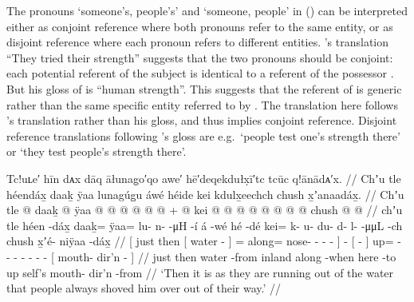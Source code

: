 The pronouns  ‘someone’s, people’s’ and  ‘someone, people’ in (\lastx) can be interpreted either as conjoint reference where both pronouns refer to the same entity, or as disjoint reference where each pronoun refers to different entities.
\citeauthor{swanton:1909}’s translation “They tried their strength” suggests that the two pronouns should be conjoint: each potential referent of the subject  is identical to a referent of the possessor .
But his gloss of   is “human strength”.
This suggests that the referent of  is generic rather than the same specific entity referred to by .
The translation here follows \citeauthor{swanton:1909}’s translation rather than his gloss, and thus implies conjoint reference.
Disjoint reference translations following \citeauthor{swanton:1909}’s gloss are e.g.\ ‘people test one’s strength there’ or ‘they test people’s strength there’.

\ex\label{ex:93-17-out-of-water-push}%
%
\begingl
	\glpreamble	Tc!uʟe′ hīn dᴀx dāq āłunag̣o′qo awe′ hē′deqekdułx̣ī′tc tcūc q!ānādᴀ′x. //
	\glpreamble	Chʼu tle héendáx̱ daaḵ ÿaa lunagúg̱u áwé héide kei kdulx̱eechch chush x̱ʼanaadáx̱. //
	\gla	{} Chʼu tle {}  @ {} {}
			daaḵ @ ÿaa @  @ {} @ {} @ {} @ {} {} 
		 @ {} +
		{}  @ {} {}
		kei @  @ {} @ {} @ {} @ {} @ {} @ {} @ {}
		{} chush  @ {} @ {} {} //
	\glb	{} chʼu tle {} héen -dáx̱ {}
			daaḵ= ÿaa= lu- n-  -μH -í {}
		á -wé
		{} hé -dé {}
		kei= k- u- du- d- l-  -μμL -ch
		{} chush x̱ʼé- niÿaa -dáx̱ {} //
	\glc	{}[ just then {}[ water - {}]
			= along= nose- -  - - {}]
		 -
		{}[  - {}]
		up= - - - - -  - -
		{}[  mouth- dir’n - {}] //
	\gld	{} just then {} water -from {}
			inland along  {} {} {} -when {}
		 {}
		{} here -to {}
		up  {} {} {} {} {} {} {}
		{} self’s mouth- dir’n -from {} //
	\glft	‘Then it is as they are running out of the water that people always shoved him over out of their way.’
		//
\endgl
\xe

